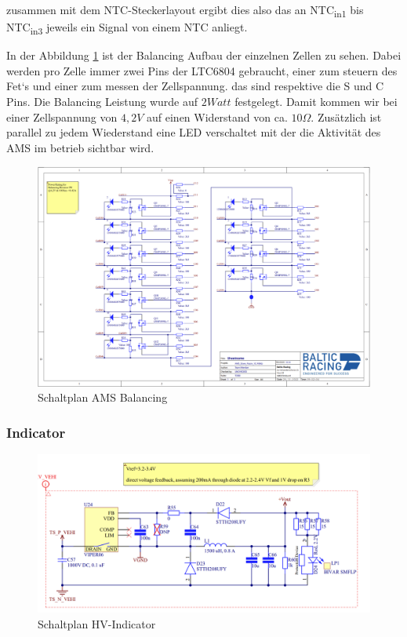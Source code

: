 zusammen mit dem \ac{NTC}-Steckerlayout ergibt dies also das an \ac{NTC}\textsubscript{in1} bis \ac{NTC}\textsubscript{in3} jeweils ein Signal von einem \ac{NTC} anliegt.

In der Abbildung \ref{fig:amsbalancingschematic} ist der Balancing Aufbau der einzelnen Zellen zu sehen. Dabei werden pro Zelle immer zwei Pins der LTC6804 gebraucht, einer zum steuern des Fet`s und einer zum messen der Zellspannung. das sind respektive die S und C Pins. Die Balancing Leistung wurde auf \ensuremath{2 Watt} festgelegt. Damit kommen wir bei einer Zellspannung von \ensuremath{4,2V} auf einen Widerstand von ca. \ensuremath{10 \Omega}. Zusätzlich ist parallel zu jedem Wiederstand eine \ac{LED} verschaltet mit der die Aktivität des \ac{AMS} im betrieb sichtbar wird.

\begin{figure}
	\centering
	\includegraphics[width=0.7\linewidth]{bilder/AMS_Balancing_Schematic}
	\caption{Schaltplan \ac{AMS} Balancing}
	\label{fig:amsbalancingschematic}
\end{figure}

\FloatBarrier
\subsubsection{ Indicator}

\begin{figure}
	\centering
	\includegraphics[width=0.7\linewidth]{bilder/HV_indicator_schematic}
	\caption{Schaltplan \ac{HV}-Indicator}
	\label{fig:hvindicatorschematic}
\end{figure}

